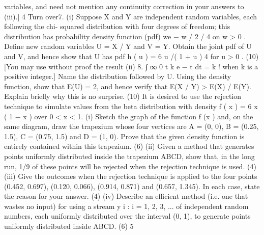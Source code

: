 variables, and need not mention any continuity correction in your answers to (iii).]
4
Turn over7.
(i)
Suppose X and Y are independent random variables, each following the chi-
squared distribution with four degrees of freedom; this distribution has
probability density function (pdf) we − w / 2 / 4 on w > 0 .
Define new random variables U = X / Y and V = Y. Obtain the joint pdf of U
and V, and hence show that U has pdf h ( u ) = 6 u /( 1 + u ) 4 for u > 0 .
(10)
[You may use without proof the result
(ii)
8.
∫
∞
0
t k e − t dt = k ! when k is a positive integer.]
Name the distribution followed by U. Using the density function, show that
E(U) = 2, and hence verify that E(X / Y) > E(X) / E(Y). Explain briefly why this
is no surprise.
(10)
It is desired to use the rejection technique to simulate values from the beta distribution
with density f ( x ) = 6 x ( 1 − x ) over 0 < x < 1.
(i) Sketch the graph of the function f (x ) and, on the same diagram, draw the
trapezium whose four vertices are A = (0, 0), B = (0.25, 1.5), C = (0.75, 1.5)
and D = (1, 0). Prove that the given density function is entirely contained
within this trapezium.
(6)
(ii) Given a method that generates points uniformly distributed inside the
trapezium ABCD, show that, in the long run, 1/9 of these points will be
rejected when the rejection technique is used.
(4)
(iii) Give the outcomes when the rejection technique is applied to the four points
(0.452, 0.697), (0.120, 0.066), (0.914, 0.871) and (0.657, 1.345). In each case,
state the reason for your answer.
(4)
(iv) Describe an efficient method (i.e. one that wastes no input) for using a stream
{y i : i = 1, 2, 3, ...} of independent random numbers, each uniformly distributed
over the interval (0, 1), to generate points uniformly distributed inside ABCD.
(6)
5
